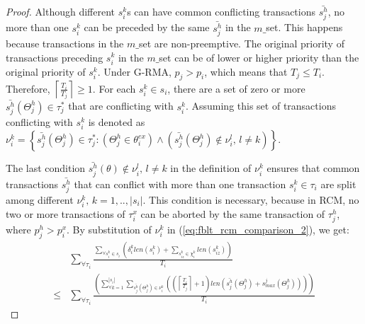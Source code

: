 \documentclass[a4paper,english]{article}
\newtheorem{proof}{Proof}
\begin{document}
\begin{proof}
Although different $s_{i}^{k}$s can have common conflicting transactions
$\bar{s_{j}^{h}}$, no more than one $s_{i}^{k}$ can be preceded
by the same $\bar{s_{j}^{h}}$ in the $m\_$set. This happens because
transactions in the $m\_$set are non-preemptive. 
%
The original priority of transactions preceding $s_{i}^{k}$ in the $m\_$set can be of
lower or higher priority than the original priority of $s_{i}^{k}$. Under
G-RMA, $p_{j}>p_{i}$, which means that $T_{j}\le T_{i}$. Therefore, $\left\lceil \frac{T_{i}}{T_{j}}\right\rceil \ge1$.
For each $s_{i}^{k}\in s_{i}$, there are a set of zero or more $\bar{s_{j}^{h}}(\Theta_j^h)\in\tau_{j}^{*}$
that are conflicting with $s_{i}^{k}$. Assuming this set of 
transactions conflicting with $s_{i}^{k}$ is denoted as $\nu_{i}^{k}=\left\{ \bar{s_{j}^{h}}(\Theta_j^h)\in\tau_{j}^{*}:\left(\Theta_j^h\in\theta_{i}^{ex}\right)\wedge\left(\bar{s_{j}^{h}}(\Theta_j^h)\not\in\nu_{i}^{l},\, l\ne k\right)\right\} $.


The last condition $\bar{s_{j}^{h}}(\theta)\not\in\nu_{i}^{l},\, l\ne k$
in the definition of $\nu_{i}^{k}$ ensures that common transactions $\bar{s_{j}^{h}}$
that can conflict with more than one transaction $s_{i}^{k}\in\tau_{i}$
are split among different $\nu_{i}^{k},\, k=1,..,|s_{i}|$. This
condition is necessary, because in RCM, no two or more transactions
of $\tau_{i}^{x}$ can be aborted by the same transaction of $\tau_{j}^{h}$, 
where $p_{j}^{h}>p_{i}^{x}$. By substitution of $\nu_{i}^{k}$ in
(\ref{eq:fblt_rcm_comparison_2}), we get: 
\begin{eqnarray}
 & \sum_{\forall\tau_{i}}\frac{\sum_{\forall s_{i}^{k}\in s_{i}}\left(\delta_i^klen(s_{i}^{k})+\sum_{s_{iz}^k\in \chi_i^k} len(s_{iz}^{k})\right)}{T_{i}}\label{eq:fblt_rcm_comparison_4}\\
\le & \sum_{\forall\tau_{i}}\frac{\left(\sum_{\forall k=1}^{|s_{i}|}\sum_{\bar{s_{j}^{h}}(\Theta_j^h)\in\nu_{i}^{k}}\left(\left(\left\lceil \frac{T_{i}}{T_{j}}\right\rceil +1\right)len\left(\bar{s_{j}^{h}}(\Theta_j^h)+s_{max}^{j}(\Theta_j^h)\right)\right)\right)}{T_{i}}\nonumber 
\end{eqnarray}



\end{proof}
\end{document}
